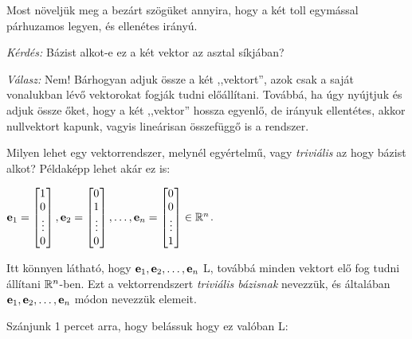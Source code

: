 \documentclass[a4paper,11.5pt]{article}
\begin{document}
	Most növeljük meg a bezárt szögüket annyira, hogy a két toll egymással párhuzamos legyen, és ellenétes irányú.
	\begin{center}
		\emph{Kérdés:} Bázist alkot-e ez a két vektor az asztal síkjában?
	\end{center}
	
	\emph{Válasz:} Nem! Bárhogyan adjuk össze a két ,,vektort'', azok csak a saját vonalukban lévő vektorokat fogják tudni előállítani. Továbbá, ha úgy nyújtjuk és adjuk össze őket, hogy a két ,,vektor'' hossza egyenlő, de irányuk ellentétes, akkor nullvektort kapunk, vagyis lineárisan összefüggő is a rendszer.
	
	Milyen lehet egy vektorrendszer, melynél egyértelmű, vagy \emph{triviális} az hogy bázist alkot?
	Példaképp lehet akár ez is:
	
	{\centering 
		$\e _1=\begin{bmatrix}
		1\s \\
		0\s \\
		\vdots\\
		0\s \\
		\end{bmatrix},
		\e _2=\begin{bmatrix}
		0\s \\
		1\s \\
		\vdots\\
		0\s \\
		\end{bmatrix}, \dots ,
		\e _n=\begin{bmatrix}
		0\s \\
		0\s \\
		\vdots\\
		1\s \\
		\end{bmatrix} \in \Rn$.
		\par}
	
	\noindent Itt könnyen látható, hogy $\textbf{e}_1, \textbf{e}_2, \ldots, \textbf{e}_n$ L, továbbá minden vektort elő fog tudni állítani $\mathbb{R}^{n}$-ben. Ezt a vektorrendszert \emph{triviális bázisnak} nevezzük, és általában $\textbf{e}_1, \textbf{e}_2, \ldots, \textbf{e}_n$ módon nevezzük elemeit.
	
	Szánjunk 1 percet arra, hogy belássuk hogy ez valóban L:
	
\end{document}
